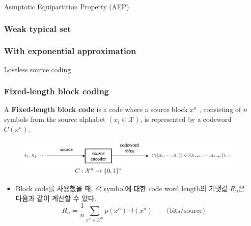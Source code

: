 \documentclass[9pt]{beamer}
\begin{document}
\begin{section}{Asmptotic Equipartition Property (AEP)}
\begin{frame}
        
        \end{frame}  

        \begin{frame}
            \frametitle{Weak typical set}
            \begin{corollary}
                
            \end{corollary}

        
        \end{frame}  

        \begin{frame}
            \frametitle{With exponential approximation }
        
            
        
        \end{frame}
    \end{section}

    \begin{section}{Loseless source coding}
        
        \begin{frame}
            \frametitle{Fixed-length block coding}
            \begin{definition}
                A \textbf{Fixed-length block code }is a code where a source block  $x^n$ , consisting of  $n$ symbols from the source alphabet $(x_i \in \mathcal X)$, is represented by a codeword $C(x^n)$.
            \end{definition}
            \begin{figure}
                \includegraphics[width=0.9\columnwidth]{image/L3_block.png}
            \end{figure}
            \begin{itemize}
                \item Block code를 사용했을 때, 각 symbol에 대한 code word length의 기댓값 $R_n$은 다음과 같이 계산할 수 있다.
                $$R_n = \frac{1}{n} \sum_{x^n \in \mathcal X^n} p(x^n) \cdot l(x^n)\qquad \text{(bits/source)}$$
            \end{itemize}
        \end{frame}
    \end{section}
\end{document}

